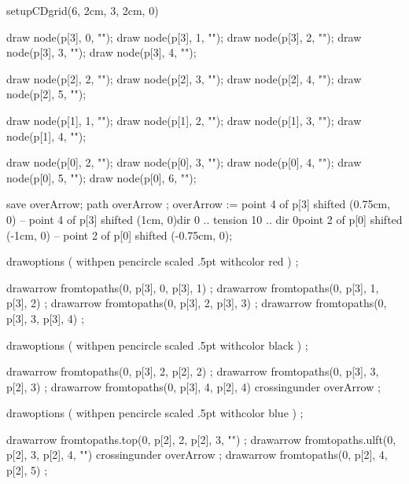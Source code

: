 
\usemodule[commDiag]

\startMPpage

setupCDgrid(6, 2cm, 3, 2cm, 0)


draw node(p[3], 0, "");
draw node(p[3], 1, "");
draw node(p[3], 2, "");
draw node(p[3], 3, "");
draw node(p[3], 4, "");

draw node(p[2], 2, "");
draw node(p[2], 3, "");
draw node(p[2], 4, "");
draw node(p[2], 5, "");

draw node(p[1], 1, "");
draw node(p[1], 2, "");
draw node(p[1], 3, "");
draw node(p[1], 4, "");

draw node(p[0], 2, "");
draw node(p[0], 3, "");
draw node(p[0], 4, "");
draw node(p[0], 5, "");
draw node(p[0], 6, "");



save overArrow; path overArrow ;
overArrow :=
  point 4 of p[3] shifted (0.75cm, 0) --
  point 4 of p[3] shifted (1cm, 0){dir 0} ..
  tension 10 ..
  {dir 0}point 2 of p[0] shifted (-1cm, 0) --
  point 2 of p[0] shifted (-0.75cm, 0);


drawoptions (
  withpen pencircle scaled .5pt
  withcolor red
) ;
  
drawarrow fromtopaths(0, p[3], 0, p[3], 1) ;
drawarrow fromtopaths(0, p[3], 1, p[3], 2) ;
drawarrow fromtopaths(0, p[3], 2, p[3], 3) ;
drawarrow fromtopaths(0, p[3], 3, p[3], 4) ;

drawoptions (
  withpen pencircle scaled .5pt
  withcolor black
) ;

drawarrow fromtopaths(0, p[3], 2, p[2], 2) ;
drawarrow fromtopaths(0, p[3], 3, p[2], 3) ;
drawarrow fromtopaths(0, p[3], 4, p[2], 4) crossingunder overArrow ;

drawoptions (
  withpen pencircle scaled .5pt
  withcolor blue
) ;

drawarrow fromtopaths.top(0, p[2], 2, p[2], 3, "") ;
drawarrow fromtopaths.ulft(0, p[2], 3, p[2], 4, "") crossingunder overArrow ;
drawarrow fromtopaths(0, p[2], 4, p[2], 5) ;

